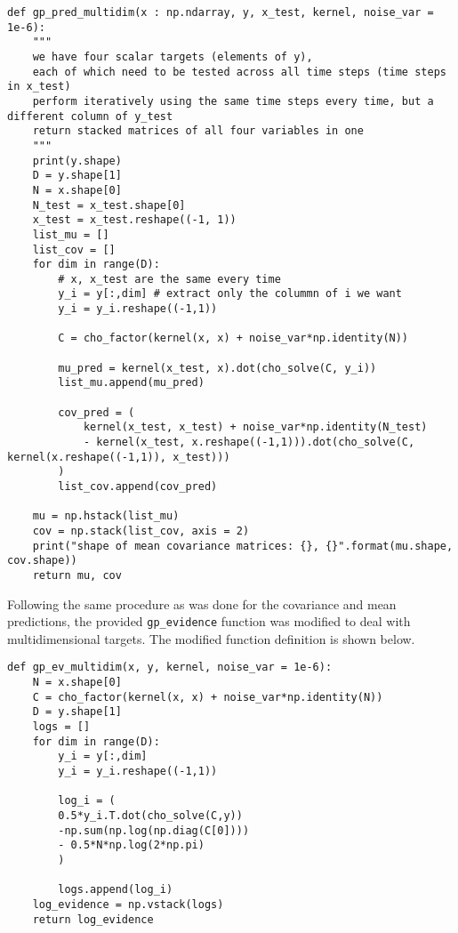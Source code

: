\begin{verbatim}
def gp_pred_multidim(x : np.ndarray, y, x_test, kernel, noise_var = 1e-6):
    """
    we have four scalar targets (elements of y),
    each of which need to be tested across all time steps (time steps in x_test)
    perform iteratively using the same time steps every time, but a different column of y_test
    return stacked matrices of all four variables in one
    """
    print(y.shape)
    D = y.shape[1]
    N = x.shape[0]
    N_test = x_test.shape[0]
    x_test = x_test.reshape((-1, 1))
    list_mu = []
    list_cov = []
    for dim in range(D):
        # x, x_test are the same every time
        y_i = y[:,dim] # extract only the colummn of i we want
        y_i = y_i.reshape((-1,1))
        
        C = cho_factor(kernel(x, x) + noise_var*np.identity(N))
        
        mu_pred = kernel(x_test, x).dot(cho_solve(C, y_i))
        list_mu.append(mu_pred)
        
        cov_pred = (
            kernel(x_test, x_test) + noise_var*np.identity(N_test)
            - kernel(x_test, x.reshape((-1,1))).dot(cho_solve(C, kernel(x.reshape((-1,1)), x_test)))
        )
        list_cov.append(cov_pred)
    
    mu = np.hstack(list_mu)
    cov = np.stack(list_cov, axis = 2)
    print("shape of mean covariance matrices: {}, {}".format(mu.shape, cov.shape))
    return mu, cov
\end{verbatim}


Following the same procedure as was done for the covariance and mean predictions, the provided \verb+gp_evidence+ function was modified to deal with multidimensional targets. The modified function definition is shown below.

\begin{verbatim}
def gp_ev_multidim(x, y, kernel, noise_var = 1e-6):
    N = x.shape[0]
    C = cho_factor(kernel(x, x) + noise_var*np.identity(N))    
    D = y.shape[1]
    logs = []
    for dim in range(D):
        y_i = y[:,dim]
        y_i = y_i.reshape((-1,1))
        
        log_i = (
        0.5*y_i.T.dot(cho_solve(C,y))
        -np.sum(np.log(np.diag(C[0])))
        - 0.5*N*np.log(2*np.pi)
        )
        
        logs.append(log_i)
    log_evidence = np.vstack(logs)
    return log_evidence
\end{verbatim}

